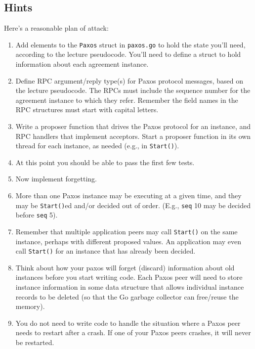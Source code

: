 \documentclass{article}
\newcommand{\code}{\texttt}
\begin{document}
\subsection{Hints}
Here's a reasonable plan of attack:
\begin{enumerate}
    \item Add elements to the \code{Paxos} struct in \code{paxos.go} to hold the state you'll
    need, according to the lecture pseudocode. You'll need to define a
    struct to hold information about each agreement instance.

    \item Define RPC argument/reply type(s) for Paxos protocol messages,
    based on the lecture pseudocode. The RPCs must include the
    sequence number for the agreement instance to which they refer.
    Remember the field names in the RPC structures must start with
    capital letters.

    \item Write a proposer function that drives the Paxos protocol for an
    instance, and RPC handlers that implement acceptors. Start a
    proposer function in its own thread for each instance, as needed
    (e.g., in \code{Start()}).
    
    \item At this point you should be able to pass the first few tests.

    \item Now implement forgetting.

    \item More than one Paxos instance may be executing at a given time,
and they may be \code{Start()}ed and/or decided out of order. (E.g., \code{seq} 10 may
be decided before \code{seq} 5).

    \item Remember that multiple application peers may call \code{Start()} on the
same instance, perhaps with different proposed values. An application
may even call \code{Start()} for an instance that has already been decided.

    \item Think about how your paxos will forget (discard) information about
old instances before you start writing code. Each Paxos peer will need
to store instance information in some data structure that allows
individual instance records to be deleted (so that the Go garbage
collector can free/reuse the memory).

    \item You do not need to write code to handle the situation where a
Paxos peer needs to restart after a crash. If one of your Paxos peers
crashes, it will never be restarted.


\end{enumerate}
\end{document}
